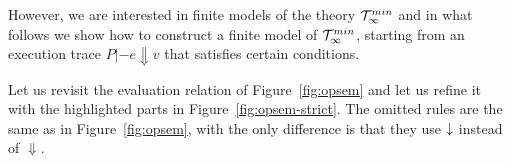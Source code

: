 However, we are interested in finite models of the theory ${\cal T}_\infty^{min}$ and in what 
follows we show how to construct a finite model of ${\cal T}_{\infty}^{min}$, starting from an execution 
trace $P |- e \Downarrow v$ that satisfies certain conditions. 



Let us revisit the 
evaluation relation of Figure~\ref{fig:opsem} and let us refine it with the highlighted
parts in Figure~\ref{fig:opsem-strict}. The omitted rules are the same as in 
Figure~\ref{fig:opsem}, with the only difference is that they use $\downarrow$ instead
of $\Downarrow$.

